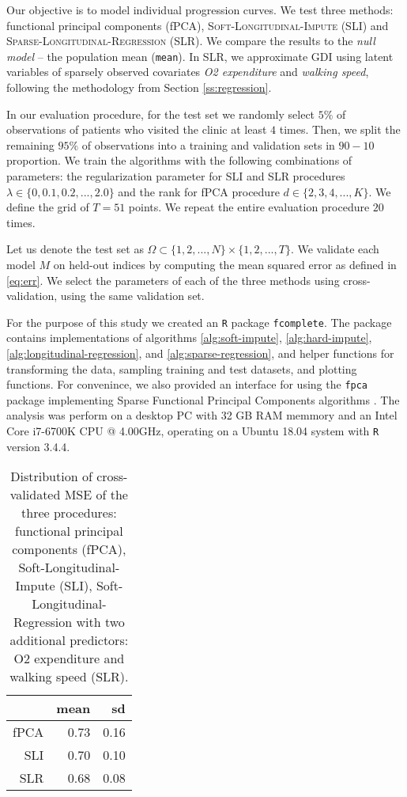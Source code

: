 \documentclass[preprint]{imsart}
\numberwithin{equation}{section}
\theoremstyle{plain}
\begin{document}
Our objective is to model individual progression curves. We test three methods: functional principal components (fPCA), \textsc{Soft-Longitudinal-Impute} (SLI) and \textsc{Sparse-Longitudinal-Regression} (SLR). We compare the results to the \emph{null model} -- the population mean (\verb|mean|). In SLR, we approximate GDI using latent variables of sparsely observed covariates \textit{O2 expenditure} and \textit{walking speed}, following the methodology from Section \ref{ss:regression}.

In our evaluation procedure, for the test set we randomly select $5\%$ of observations of patients who visited the clinic at least $4$ times. Then, we split the remaining $95\%$ of observations into a training and validation sets in $90-10$ proportion. We train the algorithms with the following combinations of parameters: the regularization parameter for SLI and SLR procedures $\lambda \in \{0, 0.1, 0.2, ..., 2.0\}$ and the rank for fPCA procedure $d \in \{2,3,4,...,K\}$. We define the grid of $T = 51$ points. We repeat the entire evaluation procedure $20$ times.

Let us denote the test set as $\Omega \subset \{1,2,...,N\} \times \{1,2,...,T\}$. We validate each model $M$ on held-out indices by computing the mean squared error as defined in \eqref{eq:err}. We select the parameters of each of the three methods using cross-validation, using the same validation set.

For the purpose of this study we created an \verb|R| package \verb|fcomplete|. The package contains implementations of algorithms \ref{alg:soft-impute}, \ref{alg:hard-impute}, \ref{alg:longitudinal-regression}, and \ref{alg:sparse-regression}, and helper functions for transforming the data, sampling training and test datasets, and plotting functions. For convenince, we also provided an interface for using the \verb|fpca| package implementing Sparse Functional Principal Components algorithms \citep{james2000principal,peng2009geometric}. The analysis was perform on a desktop PC with 32 GB RAM memmory and an Intel\textsuperscript{\textregistered} Core\textsuperscript{\texttrademark} i7-6700K CPU @ 4.00GHz, operating on a Ubuntu 18.04 system with \verb|R| version 3.4.4.

\begin{table}[ht]
  \centering
\begin{tabular}{rrr}
  \hline
 & mean & sd \\ 
  \hline
  fPCA & 0.73 & 0.16\\
  SLI & 0.70 & 0.10\\
  SLR & 0.68 & 0.08 \\
   \hline
\end{tabular}
\caption{Distribution of cross-validated MSE of the three procedures: functional principal components (fPCA), Soft-Longitudinal-Impute (SLI), Soft-Longitudinal-Regression with two additional predictors: O2 expenditure and walking speed (SLR).}
\label{tbl:data-res}
\end{table}
\end{document}

